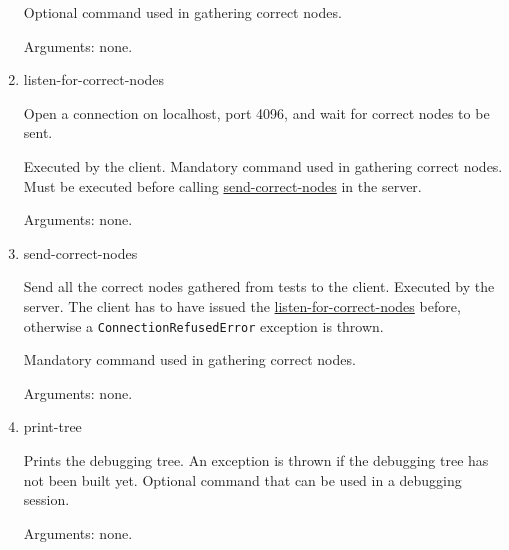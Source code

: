 \begin{enumerate}
Optional command used in gathering correct nodes.

Arguments: none.
\item listen-for-correct-nodes
\label{command:listen-for-correct-nodes}

Open a connection on localhost, port 4096, and wait for correct nodes to be sent.

Executed by the client.
Mandatory command used in gathering correct nodes.
Must be executed before calling \hyperref[command:send-correct-nodes]{send-correct-nodes} in the server.

Arguments: none.
\item send-correct-nodes
\label{command:send-correct-nodes}

Send all the correct nodes gathered from tests to the client.
Executed by the server.
The client has to have issued the \hyperref[command:listen-for-correct-nodes]{listen-for-correct-nodes} before, otherwise a \verb|ConnectionRefusedError| exception is thrown.

Mandatory command used in gathering correct nodes.

Arguments: none.
\item print-tree
\label{command:print-tree}

Prints the debugging tree.
An exception is thrown if the debugging tree has not been built yet.
Optional command that can be used in a debugging session.

Arguments: none.
\end{enumerate}

